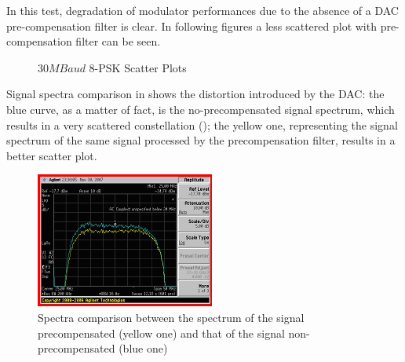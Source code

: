 In this test, degradation of modulator performances due to the absence of a DAC pre-compensation filter is clear. In following figures a less scattered plot with pre-compensation filter can be seen.

\begin{figure} \centering
{} \qquad
{} %
\caption{\(30 \unit{MBaud}\) 8-PSK Scatter Plots} \label{fig:8PSK30MBaud}
\end{figure}

Signal spectra comparison in  shows the distortion introduced by the DAC: the blue curve, as a matter of fact, is the no-precompensated signal spectrum, which results in a very scattered constellation (); the yellow one, representing the signal spectrum of the same signal processed by the precompensation filter, results in a better scatter plot.

\begin{figure} \centering
\includegraphics[scale=1.3]{DACvsNDAC}
\caption{Spectra comparison between the spectrum of the signal precompensated (yellow one) and that of the signal non-precompensated (blue one)} \label{fig:SpectrComp}
\end{figure}


